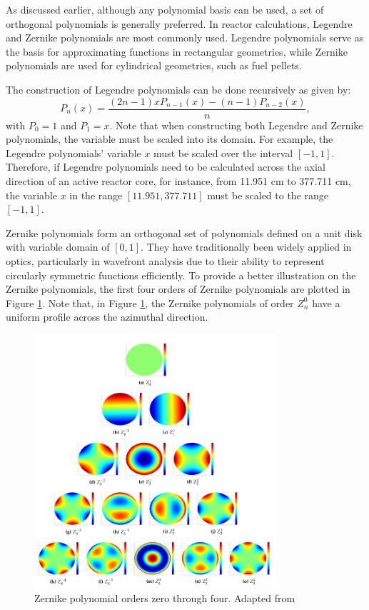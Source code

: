 As discussed earlier, although any polynomial basis can be used, a set of orthogonal polynomials is generally preferred. In reactor calculations, Legendre and Zernike polynomials are most commonly used. Legendre polynomials serve as the basis for approximating functions in rectangular geometries, while Zernike polynomials are used for cylindrical geometries, such as fuel pellets.

The construction of Legendre polynomials can be done recursively as given by:
\begin{equation}
    P_n\left(x\right)=\frac{\left(2n-1\right)xP_{n-1}\left(x\right)-\left(n-1\right)P_{n-2}\left(x\right)}{n},
\end{equation}
with $P_0=1$ and $P_1=x$. Note that when constructing both Legendre and Zernike polynomials, the variable must be scaled into its domain. For example, the Legendre polynomials' variable $x$ must be scaled over the interval $[-1, 1]$. Therefore, if Legendre polynomials need to be calculated across the axial direction of an active reactor core, for instance, from 11.951 cm to 377.711 cm, the variable $x$ in the range $[11.951, 377.711]$ must be scaled to the range $[-1, 1]$.

Zernike polynomials form an orthogonal set of polynomials defined on a unit disk with variable domain of $[0, 1]$. They have traditionally been widely applied in optics, particularly in wavefront analysis due to their ability to represent circularly symmetric functions efficiently. To provide a better illustration on the Zernike polynomials, the first four orders of Zernike polynomials are plotted in Figure \ref{fig_21}. Note that, in Figure \ref{fig_21}, the Zernike polynomials of order $Z_n^0$ have a uniform profile across the azimuthal direction.

\begin{figure}
    \centering
    \includegraphics[width=0.8\textwidth]{figs/zernike.png}
    \caption[Zernike polynomial orders zero through four]{Zernike polynomial orders zero through four. Adapted from \cite{ellis}}
    \label{fig_21}
\end{figure}

